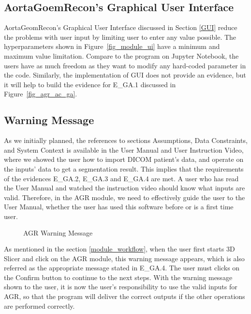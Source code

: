 \subsection{AortaGoemRecon's Graphical User Interface}

AortaGeomRecon's Graphical User Interface discussed in Section \ref{GUI} reduce the problems with user input by limiting user to enter any value possible. The hyperparameters shown in Figure~\ref{fig_module_ui} have a minimum and maximum value limitation. Compare to the program on Jupyter Notebook, the users have as much freedom as they want to modify any hard-coded parameter in the code. Similarly, the implementation of GUI does not provide an evidence, but it will help to build the evidence for E\_GA.1 discussed in Figure~\ref{fig_agr_ac_ga}.

\subsection{Warning Message}

As we initially planned, the references to sections Assumptions, Data Constraints, and System Context is available in the User Manual and User Instruction Video, where we showed the user how to import DICOM patient's data, and operate on the inputs' data to get a segmentation result. This implies that the requirements of  the evidences E\_GA.2, E\_GA.3 and E\_GA.4 are met. A user who has read the User Manual and watched the instruction video should know what inputs are valid. Therefore, in the AGR module, we need to effectively guide the user to the User Manual, whether the user has used this software before or is a first time user.

\begin{figure}[H]
    \centering
    \caption[AGR Warning Message]{AGR Warning Message}
    \label{fig_agr_ac_wm}
\end{figure}

As mentioned in the section \ref{module_workflow}, when the user first starts 3D Slicer and click on the AGR module, this warning message appears, which is also referred as the appropriate message stated in E\_GA.4. The user must clicks on the Confirm button to continue to the next steps. With the warning message shown to the user, it is now the user's responsibility to use the valid inputs for AGR, so that the program will deliver the correct outputs if the other operations are performed correctly. 